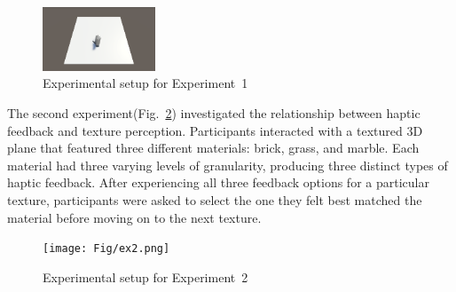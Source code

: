 \documentclass[a4paper,twocolumn]{article}
\begin{document}
\begin{figure}[H]\centering
	\includegraphics[width=0.3\textwidth]{Fig/ex1.png}%
	\caption{Experimental setup for Experiment~1}\label{fig:ex1}%
\end{figure}


The second experiment(Fig.~\ref{fig:ex2}) investigated the relationship between haptic feedback and texture perception. Participants interacted with a textured 3D plane that featured three different materials: brick, grass, and marble. Each material had three varying levels of granularity, producing three distinct types of haptic feedback. After experiencing all three feedback options for a particular texture, participants were asked to select the one they felt best matched the material before moving on to the next texture.

\begin{figure}[H]\centering
	\texttt{[image: Fig/ex2.png]}%
	\caption{Experimental setup for Experiment~2}\label{fig:ex2}%
\end{figure}



\end{document}
